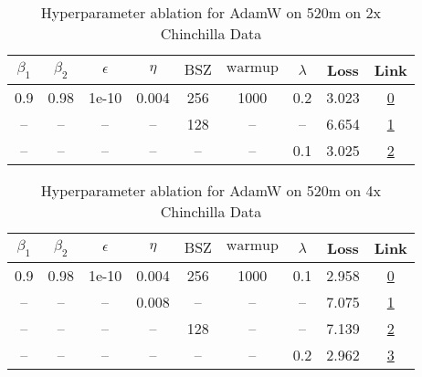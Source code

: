 \begin{table}[H]
\centering
\caption{Hyperparameter ablation for AdamW on 520m on 2x Chinchilla Data}
\label{tab:ablation_adamw_520m_2}
\begin{tabular}{ccccccccc}
\toprule
$\beta_1$ & $\beta_2$ & $\epsilon$ & $\eta$ & $\mathrm{BSZ}$ & $\mathrm{warmup}$ & $\lambda$ & Loss & Link \\
\midrule
0.9 & 0.98 & 1e-10 & 0.004 & 256 & 1000 & 0.2 & 3.023 & \href{https://wandb.ai/stanford-mercury/optimizer-scaling/runs/sweep-520m-21B-adamws9d215dlr0.004-wd0.2-minlr0-warmup1000-b10.9-d16851}{0} \\
\midrule
-- & -- & -- & -- & 128 & -- & -- & 6.654 & \href{https://wandb.ai/stanford-mercury/optimizer-scaling/runs/sweep-520m-21B-adamwsffc6bdlr0.004-wd0.2-minlr0-warmup1000-b10.9-646b5d}{1} \\
-- & -- & -- & -- & -- & -- & 0.1 & 3.025 & \href{https://wandb.ai/stanford-mercury/optimizer-scaling/runs/sweep-520m-21B-adamws529f50lr0.004-wd0.1-minlr0-warmup1000-b10.9-c43fcb}{2} \\
\bottomrule
\end{tabular}
\end{table}

\begin{table}[H]
\centering
\caption{Hyperparameter ablation for AdamW on 520m on 4x Chinchilla Data}
\label{tab:ablation_adamw_520m_4}
\begin{tabular}{ccccccccc}
\toprule
$\beta_1$ & $\beta_2$ & $\epsilon$ & $\eta$ & $\mathrm{BSZ}$ & $\mathrm{warmup}$ & $\lambda$ & Loss & Link \\
\midrule
0.9 & 0.98 & 1e-10 & 0.004 & 256 & 1000 & 0.1 & 2.958 & \href{https://wandb.ai/stanford-mercury/optimizer-scaling/runs/sweep-520m-42B-adamwbc2b89lr0.004-wd0.1-minlr0-warmup1000-b10.9--50dbd9}{0} \\
\midrule
-- & -- & -- & 0.008 & -- & -- & -- & 7.075 & \href{https://wandb.ai/stanford-mercury/optimizer-scaling/runs/sweep-520m-42B-adamwf6bfb1lr0.008-wd0.1-minlr0-warmup1000-b10.9--c0b516}{1} \\
-- & -- & -- & -- & 128 & -- & -- & 7.139 & \href{https://wandb.ai/stanford-mercury/optimizer-scaling/runs/sweep-520m-42B-adamwf14f39lr0.004-wd0.1-minlr0-warmup1000-b10.9--48b1c7}{2} \\
-- & -- & -- & -- & -- & -- & 0.2 & 2.962 & \href{https://wandb.ai/stanford-mercury/optimizer-scaling/runs/sweep-520m-42B-adamwffc6bdlr0.004-wd0.2-minlr0-warmup1000-b10.9--69bc03}{3} \\
\bottomrule
\end{tabular}
\end{table}

